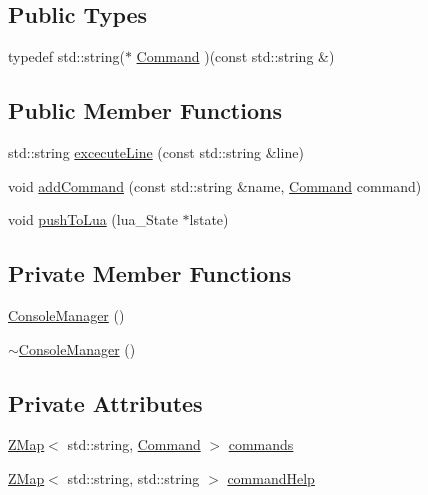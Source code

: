 \subsection*{Public Types}
\begin{DoxyCompactItemize}
\item 
typedef std\+::string($\ast$ \hyperlink{classZeta_1_1ConsoleManager_a24cbcf9867d966f7e17af66a3f7f2df2}{Command} )(const std\+::string \&)
\end{DoxyCompactItemize}
\subsection*{Public Member Functions}
\begin{DoxyCompactItemize}
\item 
std\+::string \hyperlink{classZeta_1_1ConsoleManager_aa34b2682ebcd6ca625549e0485abd031}{excecute\+Line} (const std\+::string \&line)
\item 
void \hyperlink{classZeta_1_1ConsoleManager_a26a4eb8a062008e3a74f528f70951ab3}{add\+Command} (const std\+::string \&name, \hyperlink{classZeta_1_1ConsoleManager_a24cbcf9867d966f7e17af66a3f7f2df2}{Command} command)
\item 
void \hyperlink{classZeta_1_1ConsoleManager_adecb14334f9be9e036c726ee511bf7c7}{push\+To\+Lua} (lua\+\_\+\+State $\ast$lstate)
\end{DoxyCompactItemize}
\subsection*{Private Member Functions}
\begin{DoxyCompactItemize}
\item 
\hyperlink{classZeta_1_1ConsoleManager_a9dc25e0c604db55c02e9f48daa51d099}{Console\+Manager} ()
\item 
\hyperlink{classZeta_1_1ConsoleManager_a7a6f0c4566f2353834cfe61a9d84aea5}{$\sim$\+Console\+Manager} ()
\end{DoxyCompactItemize}
\subsection*{Private Attributes}
\begin{DoxyCompactItemize}
\item 
\hyperlink{namespaceZeta_a9af2e12c4e432d2a1725f19e5a648a04}{Z\+Map}$<$ std\+::string, \hyperlink{classZeta_1_1ConsoleManager_a24cbcf9867d966f7e17af66a3f7f2df2}{Command} $>$ \hyperlink{classZeta_1_1ConsoleManager_a6d48909add29aa8abf67a142cde8f84a}{commands}
\item 
\hyperlink{namespaceZeta_a9af2e12c4e432d2a1725f19e5a648a04}{Z\+Map}$<$ std\+::string, std\+::string $>$ \hyperlink{classZeta_1_1ConsoleManager_a6373f97ce6c358df596d68b1e0420bdb}{command\+Help}
\end{DoxyCompactItemize}

